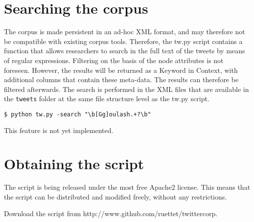 \documentclass[a4paper,10pt]{article}
\begin{document}
\section{Searching the corpus}

The corpus is made persistent in an ad-hoc XML format, and may therefore not be compatible with existing corpus tools. Therefore, the tw.py script contains a function that allows researchers to search in the full text of the tweets by means of regular expressions. Filtering on the basis of the node attributes is not foreseen. However, the results will be returned as a Keyword in Context, with additional columns that contain these meta-data. The results can therefore be filtered afterwards. The search is performed in the XML files that are available in the \texttt{tweets} folder at the same file structure level as the tw.py script.

\begin{verbatim}
$ python tw.py -search "\b[Gg]oulash.+?\b"
\end{verbatim}

This feature is not yet implemented.

\section{Obtaining the script}

The script is being released under the most free Apache2 license. This means that the script can be distributed and modified freely, without any restrictions.

Download the script from http://www.github.com/ruettet/twittercorp.

\end{document}

